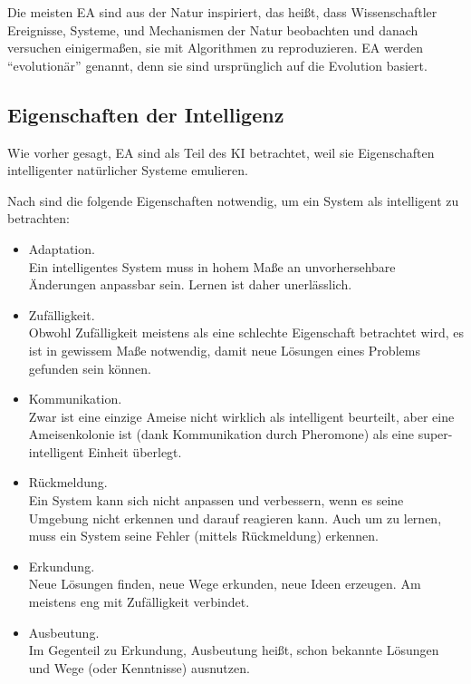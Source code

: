 \documentclass[twoside,twocolumn]{article}
\begin{document}
Die meisten EA sind aus der Natur inspiriert, das heißt, dass Wissenschaftler Ereignisse, Systeme, und Mechanismen der Natur beobachten und danach versuchen einigermaßen, sie mit Algorithmen zu reproduzieren. EA werden \enquote{evolutionär} genannt, denn sie sind ursprünglich auf die Evolution basiert. \cite{holland_ga}

\subsection{Eigenschaften der Intelligenz}
Wie vorher gesagt, EA sind als Teil des KI betrachtet, weil sie Eigenschaften intelligenter natürlicher Systeme emulieren.\par
Nach \cite{wiley_evolutionary} sind die folgende Eigenschaften notwendig, um ein System als intelligent zu betrachten:

\begin{itemize}
\item{Adaptation.}\\
Ein intelligentes System muss in hohem Maße an unvorhersehbare Änderungen anpassbar sein. Lernen ist daher unerlässlich.\\
\item{Zufälligkeit.}\\
Obwohl Zufälligkeit meistens als eine schlechte Eigenschaft betrachtet wird, es ist in gewissem Maße notwendig, damit neue Lösungen eines Problems gefunden sein können.\\
\item{Kommunikation.}\\
Zwar ist eine einzige Ameise nicht wirklich als intelligent beurteilt, aber eine Ameisenkolonie ist (dank Kommunikation durch Pheromone) als eine super-intelligent Einheit überlegt.\\
\item{Rückmeldung.}\\
Ein System kann sich nicht anpassen und verbessern, wenn es seine Umgebung nicht erkennen und darauf reagieren kann. Auch um zu lernen, muss ein System seine Fehler (mittels Rückmeldung) erkennen.\\
\item{Erkundung.}\\
Neue Lösungen finden, neue Wege erkunden, neue Ideen erzeugen. Am meistens eng mit Zufälligkeit verbindet.\\
\item{Ausbeutung.}\\
Im Gegenteil zu Erkundung, Ausbeutung heißt, schon bekannte Lösungen und Wege (oder Kenntnisse) ausnutzen.
\end{itemize}
\end{document}
